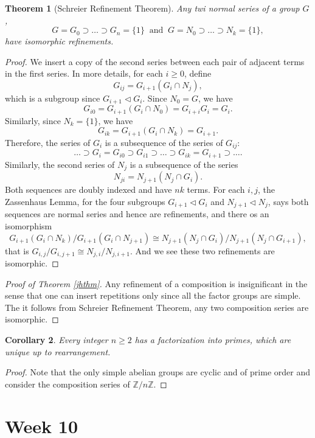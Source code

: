 \documentclass[12pt]{report}
\newtheorem{theorem}{Theorem}[section]
\newtheorem{corollary}[theorem]{Corollary}
\theoremstyle{definition}
\newcommand{\zz}{\mathbb{Z}}
\begin{document}
\begin{theorem}[Schreier Refinement Theorem]
	Any twi normal series of a group $G$,
	$$G=G_0\supset \dots\supset G_n=\{1\}~\mbox{ and }~ G=N_0\supset \dots\supset N_k=\{1\},$$
	have isomorphic refinements.
\end{theorem}

\begin{proof}
	We insert a copy of the second series between each pair of adjacent terms in the first series. In more details, for each $i\geq 0$, define $$G_{ij}=G_{i+1}(G_i\cap N_j),$$ which is a subgroup since $G_{i+1}\triangleleft G_i$. Since $N_0=G$, we have $$G_{i0}=G_{i+1}(G_i\cap N_0)=G_{i+i}G_i=G_i.$$ Similarly, since $N_k=\{1\}$, we have $$G_{ik}=G_{i+1}(G_i\cap N_{k})=G_{i+1}.$$
	Therefore, the series of $G_i$ is a subsequence of the series of $G_{ij}$:
	\[\dots\supset G_i=G_{i0} \supset G_{i1}\supset \dots\supset G_{ik}=G_{i+1}\supset \dots.\]
	Similarly, the second series of $N_j$ is a subsequence of the series $$N_{ji}=N_{j+1}(N_j\cap G_i).$$
	Both sequences are doubly indexed and have $nk$ terms. For each $i,j$, the Zassenhaus Lemma, for the four subgroups $G_{i+1}\triangleleft G_i$ and $N_{j+1}\triangleleft N_j$, says both sequences are normal series and hence are refinements, and there os an isomorphism $$ G_{i+1}(G_i\cap N_k)/G_{i+1}(G_i\cap N_{j+1}) \cong N_{j+1}(N_j\cap G_i)/N_{j+1}(N_j\cap G_{i+1}),$$ that is $G_{i,j}/G_{i,j+1}\cong N_{j,i}/N_{j,i+1}$. And we see these two refinements are isomorphic.
\end{proof}

\begin{proof}[Proof of Theorem \ref{jhthm}]
	Any refinement of a composition is insignificant in the sense that one can insert repetitions only since all the factor groups are simple. The it follows from Schreier Refinement Theorem, any two composition series are isomorphic.
\end{proof}

\begin{corollary}
	Every integer $n\geq 2$ has a factorization into primes, which are unique up to rearrangement.
\end{corollary}

\begin{proof}
	Note that the only simple abelian groups are cyclic and of prime order and consider the composition series of $\zz/n\zz$.
\end{proof}

\chapter*{Week 10}
\setcounter{chapter}{10}
\end{document}
